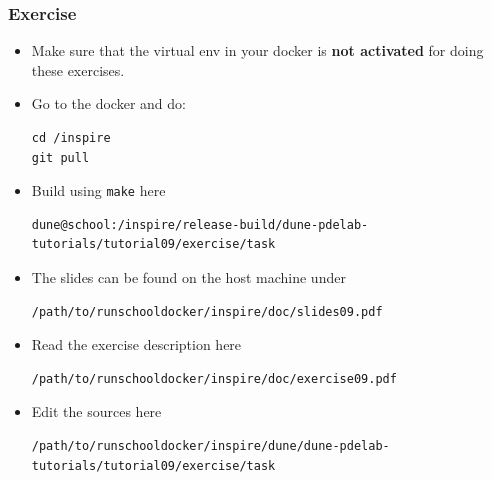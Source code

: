 \documentclass[ignorenonframetext,11pt]{beamer}
\theoremstyle{definition}
\begin{document}
\begin{frame}[fragile]
  \frametitle{Exercise}
  \begin{itemize}
  \item Make sure that the virtual env in your docker is \textbf{not activated}
    for doing these exercises.
  \item Go to the docker and do:
    \begin{lstlisting}[basicstyle=\scriptsize,breaklines=true,]
cd /inspire
git pull
    \end{lstlisting}
  \item Build using \lstinline{make} here
    \begin{lstlisting}[basicstyle=\scriptsize,breaklines=true,]
dune@school:/inspire/release-build/dune-pdelab-tutorials/tutorial09/exercise/task
    \end{lstlisting}
  \item The slides can be found on the host machine under
    \begin{lstlisting}[basicstyle=\scriptsize,breaklines=true,]
/path/to/runschooldocker/inspire/doc/slides09.pdf
    \end{lstlisting}
  \item Read the exercise description here
    \begin{lstlisting}[basicstyle=\scriptsize,breaklines=true,]
/path/to/runschooldocker/inspire/doc/exercise09.pdf
    \end{lstlisting}
  \item Edit the sources here
    \begin{lstlisting}[basicstyle=\scriptsize,breaklines=true,]
/path/to/runschooldocker/inspire/dune/dune-pdelab-tutorials/tutorial09/exercise/task
    \end{lstlisting}
  \end{itemize}
\end{frame}
\end{document}

